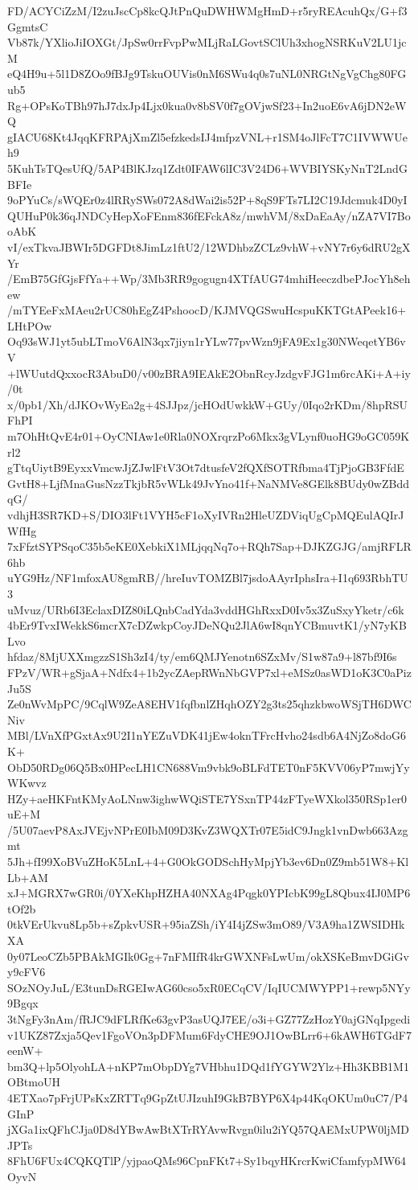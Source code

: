 FD/ACYCiZzM/I2zuJscCp8kcQJtPnQuDWHWMgHmD+r5ryREAcuhQx/G+f3GgmtsC
Vb87k/YXlioJiIOXGt/JpSw0rrFvpPwMLjRaLGovtSClUh3xhogNSRKuV2LU1jcM
eQ4H9u+5l1D8ZOo9fBJg9TskuOUVis0nM6SWu4q0s7uNL0NRGtNgVgChg80FGub5
Rg+OPsKoTBh97hJ7dxJp4Ljx0kua0v8bSV0f7gOVjwSf23+In2uoE6vA6jDN2eWQ
gIACU68Kt4JqqKFRPAjXmZl5efzkedsIJ4mfpzVNL+r1SM4oJlFcT7C1IVWWUeh9
5KuhTsTQesUfQ/5AP4BlKJzq1Zdt0IFAW6lIC3V24D6+WVBIYSKyNnT2LndGBFIe
9oPYuCs/sWQEr0z4lRRySWs072A8dWai2is52P+8qS9FTs7LI2C19Jdcmuk4D0yI
QUHuP0k36qJNDCyHepXoFEnm836fEFckA8z/mwhVM/8xDaEaAy/nZA7VI7BooAbK
vI/exTkvaJBWIr5DGFDt8JimLz1ftU2/12WDhbzZCLz9vhW+vNY7r6y6dRU2gXYr
/EmB75GfGjsFfYa++Wp/3Mb3RR9gogugn4XTfAUG74mhiHeeczdbePJocYh8ehew
/mTYEeFxMAeu2rUC80hEgZ4PshoocD/KJMVQGSwuHcspuKKTGtAPeek16+LHtPOw
Oq93sWJ1yt5ubLTmoV6AlN3qx7jiyn1rYLw77pvWzn9jFA9Ex1g30NWeqetYB6vV
+lWUutdQxxocR3AbuD0/v00zBRA9IEAkE2ObnRcyJzdgvFJG1m6rcAKi+A+iy/0t
x/0pb1/Xh/dJKOvWyEa2g+4SJJpz/jcHOdUwkkW+GUy/0Iqo2rKDm/8hpRSUFhPI
m7OhHtQvE4r01+OyCNIAw1e0Rla0NOXrqrzPo6Mkx3gVLynf0uoHG9oGC059Krl2
gTtqUiytB9EyxxVmcwJjZJwlFtV3Ot7dtusfeV2fQXfSOTRfbma4TjPjoGB3FfdE
GvtH8+LjfMnaGusNzzTkjbR5vWLk49JvYno41f+NaNMVe8GElk8BUdy0wZBddqG/
vdhjH3SR7KD+S/DIO3lFt1VYH5cF1oXyIVRn2HleUZDViqUgCpMQEulAQIrJWfHg
7xFfztSYPSqoC35b5eKE0XebkiX1MLjqqNq7o+RQh7Sap+DJKZGJG/amjRFLR6hb
uYG9Hz/NF1mfoxAU8gmRB//hreIuvTOMZBl7jsdoAAyrIphsIra+I1q693RbhTU3
uMvuz/URb6I3EclaxDIZ80iLQnbCadYda3vddHGhRxxD0Iv5x3ZuSxyYketr/c6k
4bEr9TvxIWekkS6mcrX7cDZwkpCoyJDeNQu2JlA6wI8qnYCBmuvtK1/yN7yKBLvo
hfdaz/8MjUXXmgzzS1Sh3zI4/ty/em6QMJYenotn6SZxMv/S1w87a9+l87bf9I6s
FPzV/WR+gSjaA+Ndfx4+1b2ycZAepRWnNbGVP7xl+eMSz0asWD1oK3C0aPizJu5S
Ze0nWvMpPC/9CqlW9ZeA8EHV1fqfbnlZHqhOZY2g3ts25qhzkbwoWSjTH6DWCNiv
MBl/LVnXfPGxtAx9U2I1nYEZuVDK41jEw4oknTFrcHvho24sdb6A4NjZo8doG6K+
ObD50RDg06Q5Bx0HPecLH1CN688Vm9vbk9oBLFdTET0nF5KVV06yP7mwjYyWKwvz
HZy+aeHKFntKMyAoLNnw3ighwWQiSTE7YSxnTP44zFTyeWXkol350RSp1er0uE+M
/5U07aevP8AxJVEjvNPrE0IbM09D3KvZ3WQXTr07E5idC9Jngk1vnDwb663Azgmt
5Jh+fI99XoBVuZHoK5LnL+4+G0OkGODSchHyMpjYb3ev6Dn0Z9mb51W8+KlLb+AM
xJ+MGRX7wGR0i/0YXeKhpHZHA40NXAg4Pqgk0YPIcbK99gL8Qbux4IJ0MP6tOf2b
0tkVErUkvu8Lp5b+sZpkvUSR+95iaZSh/iY4I4jZSw3mO89/V3A9ha1ZWSIDHkXA
0y07LeoCZb5PBAkMGIk0Gg+7nFMIfR4krGWXNFsLwUm/okXSKeBmvDGiGvy9cFV6
SOzNOyJuL/E3tunDsRGEIwAG60cso5xR0ECqCV/IqIUCMWYPP1+rewp5NYy9Bgqx
3tNgFy3nAm/fRJC9dFLRfKe63gvP3asUQJ7EE/o3i+GZ77ZzHozY0ajGNqIpgedi
v1UKZ87Zxja5Qev1FgoVOn3pDFMum6FdyCHE9OJ1OwBLrr6+6kAWH6TGdF7eenW+
bm3Q+lp5OlyohLA+nKP7mObpDYg7VHbhu1DQd1fYGYW2Ylz+Hh3KBB1M1OBtmoUH
4ETXao7pFrjUPsKxZRTTq9GpZtUJIzuhI9GkB7BYP6X4p44KqOKUm0uC7/P4GInP
jXGa1ixQFhCJja0D8dYBwAwBtXTrRYAvwRvgn0ilu2iYQ57QAEMxUPW0ljMDJPTs
8FhU6FUx4CQKQTlP/yjpaoQMs96CpnFKt7+Sy1bqyHKrcrKwiCfamfypMW64OyvN
